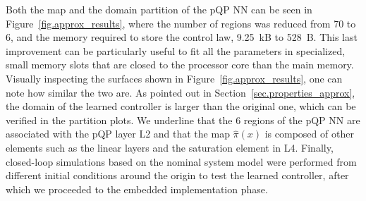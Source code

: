 Both the map and the domain partition of the pQP NN can be seen in Figure~\ref{fig.approx_results}, where the number of regions was reduced from 70 to 6, and the memory required to store the control law, 9.25~kB to 528~B. This last improvement can be particularly useful to fit all the parameters in specialized, small memory slots that are closed to the processor core than the main memory. Visually inspecting the surfaces shown in Figure~\ref{fig.approx_results}, one can note how similar the two are. As pointed out in Section~\ref{sec.properties_approx}, the domain of the learned controller is larger than the original one, which can be verified in the partition plots. We underline that the 6 regions of the pQP NN are associated with the pQP layer L2 and that the map $\hat\pi(x)$ is composed of other elements such as the linear layers and the saturation element in L4. Finally, closed-loop simulations based on the nominal system model were performed from different initial conditions around the origin to test the learned controller, after which we proceeded to the embedded implementation phase.

%

